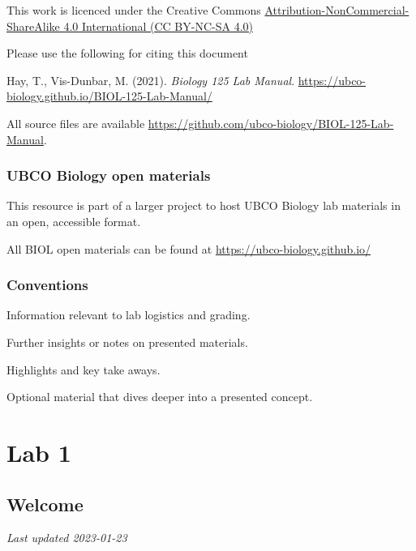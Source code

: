 \documentclass[
]{book}
\begin{document}
This work is licenced under the Creative Commons \href{https://creativecommons.org/licenses/by-nc-sa/4.0/}{Attribution-NonCommercial-ShareAlike 4.0 International (CC BY-NC-SA 4.0)}

Please use the following for citing this document

Hay, T., Vis-Dunbar, M. (2021). \emph{Biology 125 Lab Manual}. \url{https://ubco-biology.github.io/BIOL-125-Lab-Manual/}

All source files are available \url{https://github.com/ubco-biology/BIOL-125-Lab-Manual}.

\hypertarget{ubco-biology-open-materials}{%
\section*{UBCO Biology open materials}\label{ubco-biology-open-materials}}

This resource is part of a larger project to host UBCO Biology lab materials in an open, accessible format.

All BIOL open materials can be found at \url{https://ubco-biology.github.io/}

\hypertarget{conventions}{%
\section*{Conventions}\label{conventions}}

Information relevant to lab logistics and grading.

Further insights or notes on presented materials.

Highlights and key take aways.

Optional material that dives deeper into a presented concept.

\hypertarget{part-lab-1}{%
\part*{Lab 1}\label{part-lab-1}}

\hypertarget{welcome-1}{%
\chapter*{Welcome}\label{welcome-1}}

\emph{Last updated 2023-01-23}
\end{document}
